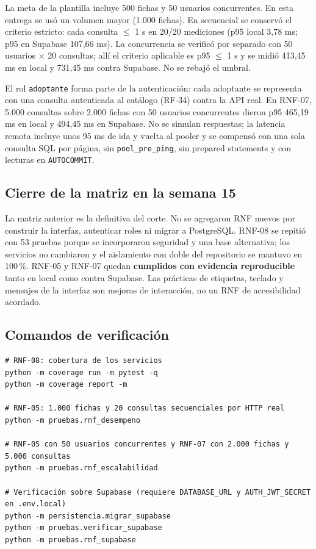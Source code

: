 \documentclass[11pt,a4paper]{article}
\newcommand{\code}[1]{\texttt{#1}}
\begin{document}
La meta de la plantilla incluye 500 fichas y 50 usuarios concurrentes. En esta
entrega se usó un volumen mayor (1.000 fichas). En secuencial se conservó el
criterio estricto: cada consulta $\leq$ 1 s en 20/20 mediciones (p95 local
3,78 ms; p95 en Supabase 107,66 ms). La concurrencia se verificó por separado
con 50 usuarios $\times$ 20 consultas; allí el criterio aplicable es p95
$\leq$ 1 s y se midió 413,45 ms en local y 731,45 ms contra Supabase. No se
rebajó el umbral.

El rol \code{adoptante} forma parte de la autenticación: cada adoptante se
representa con una consulta autenticada al catálogo (RF-34) contra la API real.
En RNF-07, 5.000 consultas sobre 2.000 fichas con 50 usuarios concurrentes
dieron p95 465,19 ms en local y 494,45 ms en Supabase. No se simulan respuestas;
la latencia remota incluye unos 95 ms de ida y vuelta al pooler y se compensó
con una sola consulta SQL por página, sin \code{pool\_pre\_ping}, sin prepared
statements y con lecturas en \code{AUTOCOMMIT}.

\subsection{Cierre de la matriz en la semana 15}

La matriz anterior es la definitiva del corte. No se agregaron RNF nuevos por
construir la interfaz, autenticar roles ni migrar a PostgreSQL. RNF-08 se repitió
con 53 pruebas porque se incorporaron seguridad y una base alternativa; los
servicios no cambiaron y el aislamiento con doble del repositorio se mantuvo en
100\,\%. RNF-05 y RNF-07 quedan \textbf{cumplidos con evidencia reproducible}
tanto en local como contra Supabase. Las prácticas de etiquetas, teclado y
mensajes de la interfaz son mejoras de interacción, no un RNF de accesibilidad
acordado.

\subsection{Comandos de verificación}

\begin{lstlisting}
# RNF-08: cobertura de los servicios
python -m coverage run -m pytest -q
python -m coverage report -m

# RNF-05: 1.000 fichas y 20 consultas secuenciales por HTTP real
python -m pruebas.rnf_desempeno

# RNF-05 con 50 usuarios concurrentes y RNF-07 con 2.000 fichas y 5.000 consultas
python -m pruebas.rnf_escalabilidad

# Verificación sobre Supabase (requiere DATABASE_URL y AUTH_JWT_SECRET en .env.local)
python -m persistencia.migrar_supabase
python -m pruebas.verificar_supabase
python -m pruebas.rnf_supabase
\end{lstlisting}
\end{document}
